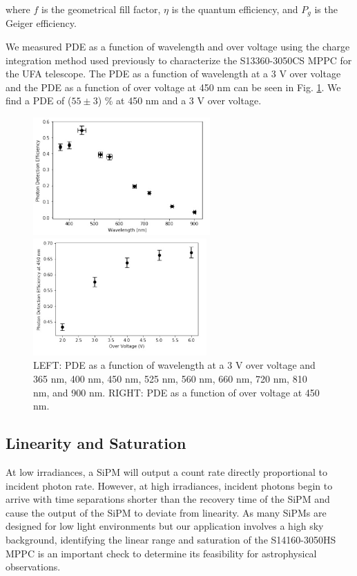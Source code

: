\documentclass{article}
\begin{document}
where $f$ is the geometrical fill factor, $\eta$ is the quantum efficiency, and $P_g$ is the Geiger efficiency.

We measured PDE as a function of wavelength and over voltage using the charge integration method used
previously to characterize the S13360-3050CS MPPC for the UFA telescope.\cite{li2019characterization} The PDE as a function of
wavelength at a 3 V over voltage and the PDE as a function of over voltage at 450 nm can be seen in Fig. \ref{fig:PDE}.
We find a PDE of ($55 \pm 3$) \% at 450 nm and a 3 V over voltage.

\begin{figure}[ht]

  \begin{minipage}[b]{0.49\textwidth}
    \centering     
    \includegraphics[height=4.5cm]{images/figura6.jpg}
  \end{minipage}
  \hfill
  \begin{minipage}[b]{0.49\textwidth}
    \centering     
    \includegraphics[height=4.5cm]{images/figura7.jpg}
  \end{minipage}
     
\caption{LEFT: PDE as a function of wavelength at a 3 V over voltage and 365 nm, 400 nm, 450 nm, 525 nm, 560 nm,
660 nm, 720 nm, 810 nm, and 900 nm. RIGHT: PDE as a function of over voltage at 450 nm.}
\label{fig:PDE}
    
\end{figure}
\subsection{Linearity and Saturation}
At low irradiances, a SiPM will output a count rate directly proportional to incident photon rate. However, at high irradiances, incident photons begin to arrive with time separations shorter than the recovery time of the SiPM and cause the output of the SiPM to deviate from linearity. As many SiPMs are designed for low light environments but our application involves a high sky background, identifying the linear range and saturation of the S14160-3050HS MPPC is an important check to determine its feasibility for astrophysical observations.
\end{document}

